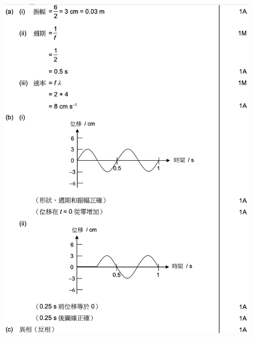 {
}{
    {\par\centering\includegraphics[width=\textwidth]{./img/ch1_earlyclass_wave_lq_2024-05-13-13-13-55.png}\par}
}


